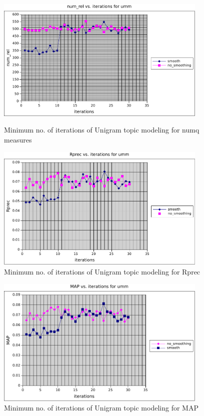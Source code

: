 \begin{figure}
    \centering
    \begin{minipage}{0.45\textwidth}
        \centering
        \includegraphics[width=0.9\textwidth]{fig/num_rel_k0iter_umm.pdf}
        \caption{Minimum no. of iterations of Unigram topic modeling for numq measures}
    \end{minipage}\hfill
    \begin{minipage}{0.45\textwidth}
        \centering
        \includegraphics[width=0.9\textwidth]{fig/rprec_k0iter_umm.pdf}
        \caption{Minimum no. of iterations of Unigram topic modeling for Rprec}
    \end{minipage}
\end{figure}
\begin{figure}
    \centering
    \begin{minipage}{0.45\textwidth}
        \centering
        \includegraphics[width=0.9\textwidth]{fig/map_k0iter_umm.pdf}
        \caption{Minimum no. of iterations of Unigram topic modeling for MAP}
    \end{minipage}
\end{figure}

